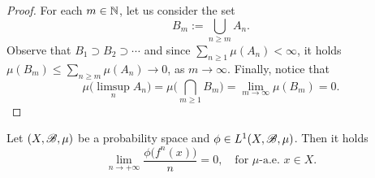 \begin{proof}
  For each $m\in\mathbb{N}$, let us consider the set
  \begin{displaymath}
    B_{m}:=\bigcup_{n\geq m} A_{n}.
  \end{displaymath}
  Observe that $B_{1}\supset B_{2}\supset\cdots$ and since $\sum_{n\geq 1}\mu(A_{n})<\infty$, it holds $\mu(B_{m})\leq \sum_{n\geq m}\mu(A_{n})\to 0$, as $m\to\infty$. Finally, notice that
  \begin{displaymath}
    \mu\Big(\limsup_{n}A_{n}\Big) = \mu\bigg(\bigcap_{m\geq 1} B_{m}\bigg) = \lim_{m\to\infty} \mu(B_{m})=0.
  \end{displaymath}
\end{proof}

\begin{lemma}\label{lem:phi-fn-div-n-to-zero}
  Let $(X,\mathscr{B},\mu)$ be a probability space and $\phi\in L^{1}(X,\mathscr{B},\mu)$. Then it holds
  \begin{displaymath}
    \lim_{n\to+\infty}\frac{\phi\big(f^{n}(x)\big)}{n}=0, \quad\text{for }\mu\text{-a.e. }x\in X.
  \end{displaymath}
\end{lemma}

